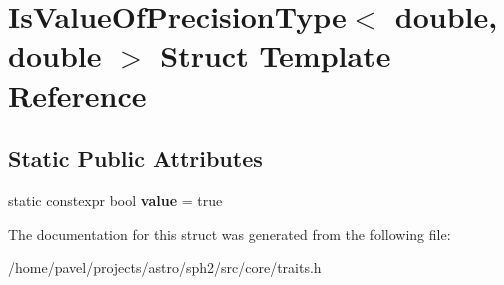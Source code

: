 \hypertarget{structIsValueOfPrecisionType_3_01double_00_01double_01_4}{}\section{Is\+Value\+Of\+Precision\+Type$<$ double, double $>$ Struct Template Reference}
\label{structIsValueOfPrecisionType_3_01double_00_01double_01_4}
\subsection*{Static Public Attributes}
\begin{DoxyCompactItemize}
\item 
\hypertarget{structIsValueOfPrecisionType_3_01double_00_01double_01_4_aa9a9861d72d5cb0aa1f62012f71c2b1e}{}\label{structIsValueOfPrecisionType_3_01double_00_01double_01_4_aa9a9861d72d5cb0aa1f62012f71c2b1e} 
static constexpr bool {\bfseries value} = true
\end{DoxyCompactItemize}


The documentation for this struct was generated from the following file\+:\begin{DoxyCompactItemize}
\item 
/home/pavel/projects/astro/sph2/src/core/traits.\+h\end{DoxyCompactItemize}
